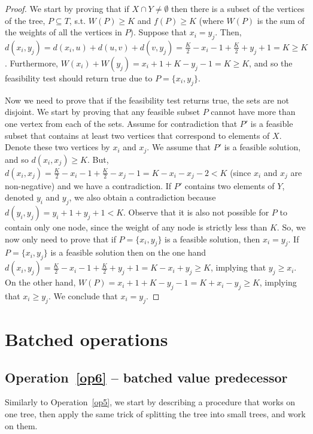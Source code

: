 \documentclass[a4paper,UKenglish]{lipics-v2016}
\theoremstyle{plain}
\begin{document}
\begin{proof}
We start by proving that if $X \cap Y \neq \emptyset$ then there is a subset of the vertices of the tree, $P \subseteq T$, s.t. $W(P) \geq K$ and $f(P) \geq K$ (where $W(P)$ is the sum of the weights of all the vertices in $P$). Suppose that  $x_i=y_j$. Then, $d(x_i,y_j) = d(x_i,u) + d(u,v) + d(v,y_j) = \frac{K}{2} - x_i -1 + \frac{K}{2} + y_j +1 = K \geq K$. Furthermore, $W(x_i) + W(y_j) = x_i + 1 + K- y_j -1 = K \geq K$, and so the feasibility test should return true due to $P = \lbrace x_i, y_j \rbrace$.

Now we need to prove that if the feasibility test returns true, the sets are not disjoint.
We start by proving that any feasible subset $P$ cannot have more than one vertex from each of the sets.
Assume for contradiction that $P'$ is a feasible subset that contains at least two vertices that correspond to elements of $X$. Denote these two vertices by $x_i$ and $x_j$. We assume that $P'$ is a feasible solution, and so $d(x_i,x_j) \geq K$. But, $d(x_i,x_j) = \frac{K}{2} - x_i -1 + \frac{K}{2} - x_j -1 = K - x_i - x_j -2 < K$ (since $x_i$ and $x_j$ are non-negative) and we have a contradiction.
If $P'$ contains two elements of $Y$, denoted $y_{i}$ and $y_{j}$, we also obtain a contradiction because
$d(y_{i},y_{j})=y_{i}+1+y_{j}+1<K$.
Observe that it is also not possible for $P$ to contain only one node, since the weight of any node is strictly less than $K$. So, we now only need to prove that if $P= \{ x_i,y_j \}$ is a feasible solution, then $x_i = y_j$.
If $P= \{ x_i,y_j \}$ is a feasible solution then on the one hand $d(x_i,y_j) = \frac{K}{2} - x_i -1 + \frac{K}{2} + y_j +1 = K - x_i + y_j \geq K$, implying that $y_j \geq x_i$. On the other hand, $W(P) = x_i + 1 + K - y_j -1 = K + x_i - y_j \geq K$, implying that $x_i \geq y_j$. We conclude that $x_i = y_j$.
\end{proof}

\section{Batched operations}\label{appendix batched operations}
\subsection{Operation~\ref{op6} -- batched value predecessor}
Similarly to Operation~\ref{op5}, we start by describing a procedure that works on one tree, then apply the same trick of splitting the tree into small trees, and work on them.
\end{document}
